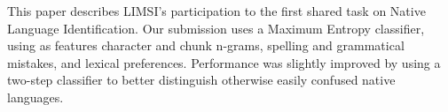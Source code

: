 This paper describes LIMSI's participation to the first shared task on Native Language Identification. Our submission uses a Maximum Entropy
 classifier, using as features character and chunk n-grams, spelling
 and grammatical mistakes, and lexical preferences. Performance was
 slightly improved by using a two-step classifier to better distinguish
 otherwise easily confused native languages.

